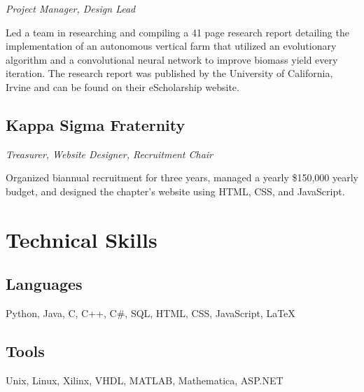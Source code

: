 \documentclass{article}
\begin{document}
\noindent\textit{Project Manager, Design Lead}

Led a team in researching and compiling a 41 page research report detailing the implementation of an 
autonomous vertical farm that utilized an evolutionary algorithm and a convolutional neural network 
to improve biomass yield every iteration. The research report was published by the University of 
California, Irvine and can be found on their eScholarship website.

\subsection{Kappa Sigma Fraternity}

\noindent\textit{Treasurer, Website Designer, Recruitment Chair}

Organized biannual recruitment for three years, managed a yearly \$150,000 yearly budget, and designed 
the chapter's website using HTML, CSS, and JavaScript.

\section{Technical Skills}

\subsection{Languages}

Python, Java, C, C++, C\#, SQL, HTML, CSS, JavaScript, \LaTeX

\subsection{Tools}

Unix, Linux, Xilinx, VHDL, MATLAB, Mathematica, ASP.NET
\end{document}
